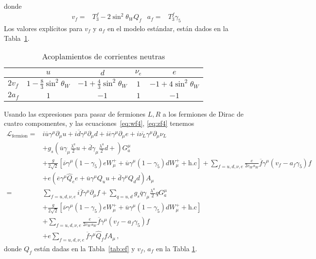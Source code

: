 \begin{itemize}
donde
\begin{align}
  v_f=&T_3^f-2 \sin^2\theta_WQ_f & a_f=&T_3^f \gamma_5
\end{align}
Los valores explícitos para  $v_f$ y $a_f$ en el modelo estándar, están dados en la Tabla~\ref{tab:zcoup}. 
\end{itemize}


\begin{table}  %
  \centering %
  \begin{tabular}{l|c|c|c|c} %
   &$u$&$d$&$\nu_e$&$e$\\\hline{}
$2v_f$&$1-\frac{8}{3}\sin^2\theta_W$&$-1+\frac{4}{3}\sin^2\theta_W$&$1$&$-1+4\sin^2\theta_W$\\
$2a_f$&$1$&$-1$&$1$&$-1$\\
  \end{tabular} %
  \caption{Acoplamientos de corrientes neutras} %
\label{tab:zcoup}
\end{table} %


Usando las expresiones para pasar de fermiones $L,R$ a los fermiones de Dirac de cuatro compomentes, y las ecuaciones~\eqref{eq:wf4}, \eqref{eq:zf4} tenemos
\begin{align}
\label{eq:lfermionfin}
   \mathcal{L}_{\text{fermion}}
  =&i\overline{u}\gamma^\mu\partial_\mu u+i\overline{d}\gamma^\mu\partial_\mu d+i\overline{e}\gamma^\mu{\partial}_\mu e
+i\overline{\nu_L}\gamma^\mu{\partial}_\mu \nu_L\nonumber\\
&+g_s \left(\overline{u}\gamma_\mu\frac{\lambda^a}{2}u
+\overline{d}\gamma_\mu\frac{\lambda^a}{2}d+ \right)G^\mu_a\nonumber\\
&+\frac{g}{2\sqrt{2}}\left[\overline{\nu}\gamma^\mu(1-\gamma_5)eW_\mu^++
\overline{u}\gamma^\mu(1-\gamma_5)d W_\mu^++\text{h.c}\right]
+\sum_{f=u,d,\nu,e}\frac{e}{2c_W s_W}\overline{f}\gamma^\mu\left(v_f-a_f\gamma_5\right)f\nonumber\\
&+e\left(\overline{e}\gamma^\mu \widehat{Q}_e e+
\overline{u}\gamma^\mu {Q}_u u+
\overline{d}\gamma^\mu {Q}_d d\right) A_\mu\nonumber\\
    =&\sum_{f=u,d,\nu,e}i\overline{f}\gamma^\mu\partial_\mu f+\sum_{q=u,d}g_s\overline{q}\gamma_\mu\frac{\lambda^a}{2}qG^\mu_a\nonumber\\
&+\frac{g}{2\sqrt{2}}\left[\overline{\nu}\gamma^\mu(1-\gamma_5)eW_\mu^++
\overline{u}\gamma^\mu(1-\gamma_5)d W_\mu^++\text{h.c}\right]\nonumber\\
&+\sum_{f=u,d,\nu,e}\frac{e}{2c_W s_W}\overline{f}\gamma^\mu\left(v_f-a_f\gamma_5\right)f\nonumber\\
&+e\sum_{f=u,d,\nu,e}\overline{f}\gamma^\mu \widehat{Q}_f f A_\mu\,,
\end{align}
donde $Q_f$ están dadas en la Tabla~\ref{tab:ef} y $v_f$, $a_f$ en la Tabla \ref{tab:zcoup}.

